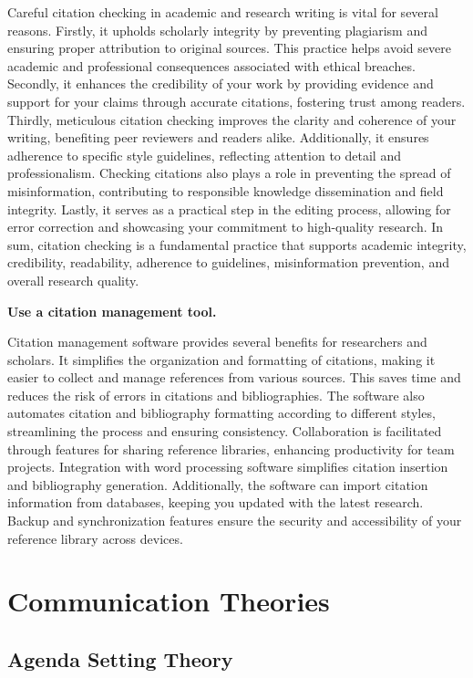 \documentclass[
  b5paper]{book}
\begin{document}
Careful citation checking in academic and research writing is vital for several reasons. Firstly, it upholds scholarly integrity by preventing plagiarism and ensuring proper attribution to original sources. This practice helps avoid severe academic and professional consequences associated with ethical breaches. Secondly, it enhances the credibility of your work by providing evidence and support for your claims through accurate citations, fostering trust among readers. Thirdly, meticulous citation checking improves the clarity and coherence of your writing, benefiting peer reviewers and readers alike. Additionally, it ensures adherence to specific style guidelines, reflecting attention to detail and professionalism. Checking citations also plays a role in preventing the spread of misinformation, contributing to responsible knowledge dissemination and field integrity. Lastly, it serves as a practical step in the editing process, allowing for error correction and showcasing your commitment to high-quality research. In sum, citation checking is a fundamental practice that supports academic integrity, credibility, readability, adherence to guidelines, misinformation prevention, and overall research quality.

\textbf{Use a citation management tool.}

Citation management software provides several benefits for researchers and scholars. It simplifies the organization and formatting of citations, making it easier to collect and manage references from various sources. This saves time and reduces the risk of errors in citations and bibliographies. The software also automates citation and bibliography formatting according to different styles, streamlining the process and ensuring consistency. Collaboration is facilitated through features for sharing reference libraries, enhancing productivity for team projects. Integration with word processing software simplifies citation insertion and bibliography generation. Additionally, the software can import citation information from databases, keeping you updated with the latest research. Backup and synchronization features ensure the security and accessibility of your reference library across devices.

\hypertarget{communication-theories-1}{%
\chapter{Communication Theories}\label{communication-theories-1}}

\hypertarget{agenda-setting-theory}{%
\section{Agenda Setting Theory}\label{agenda-setting-theory}}
\end{document}
